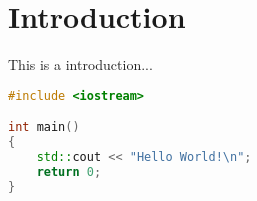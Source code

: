\chapter{Introduction}

This is a introduction...

\begin{lstlisting}[language=C++, caption=Hello world sample]
#include <iostream>

int main()
{
    std::cout << "Hello World!\n";
    return 0;
}
\end{lstlisting}


